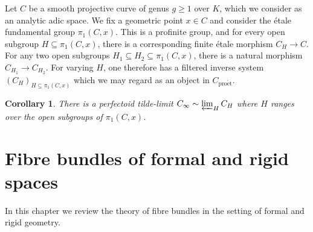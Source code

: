 \documentclass[10pt,oneside]{amsart}
\newtheorem{corollary}[theorem]{Corollary}
\theoremstyle{definition}
\newcommand{\proet}{\operatorname{pro\acute{e}t}}
\begin{document}
	Let $C$ be a smooth projective curve of genus $g\geq 1$ over $K$, which we consider as an analytic adic space. We fix a geometric point $x\in C$ and consider the \'etale fundamental group $\pi_1(C,x)$. This is a profinite group, and for every open subgroup $H\subseteq \pi_1(C,x)$, there is a corresponding finite \'etale morphism $C_H\to C$. For any two open subgroups $H_1\subseteq H_2\subseteq \pi_1(C,x)$, there is a natural morphism $C_{H_1}\to C_{H_2}$. For varying $H$, one therefore has a filtered inverse system $(C_H)_{H\subseteq \pi_1(C,x)}$ which we may regard as an object in $C_{\proet}$.
	\begin{corollary}
		There is a perfectoid tilde-limit $C_\infty \sim \varprojlim_{H}C_H$ where $H$ ranges over the open subgroups of $ \pi_1(C,x)$.
	\end{corollary}
	
		\appendix
	\section{Fibre bundles of formal and rigid spaces}
	In this chapter we review the theory of fibre bundles in the setting of formal and rigid geometry.
\end{document}
